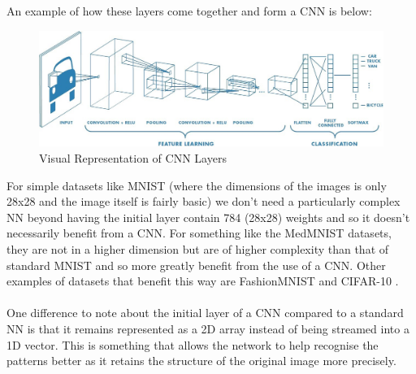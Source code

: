 An example of how these layers come together and form a CNN is below:
\begin{figure}[htbp]
	\centering
    \includegraphics[scale=0.3]{background/cnn_example.jpeg}
    \caption{Visual Representation of CNN Layers \cite{eli5_convnet}}
    \label{fig:cnn-layers}
\end{figure}

For simple datasets like MNIST (where the dimensions of the images is only 28x28 and the image itself is fairly basic) we don't need a particularly complex NN beyond having the initial layer contain 784 (28x28) weights and so it doesn't necessarily benefit from a CNN. For something like the MedMNIST datasets, they are not in a higher dimension but are of higher complexity than that of standard MNIST and so more greatly benefit from the use of a CNN. Other examples of datasets that benefit this way are FashionMNIST \cite{fashion} and CIFAR-10 \cite{cifar}.\\ \\
One difference to note about the initial layer of a CNN compared to a standard NN is that it remains represented as a 2D array instead of being streamed into a 1D vector. This is something that allows the network to help recognise the patterns better as it retains the structure of the original image more precisely.
